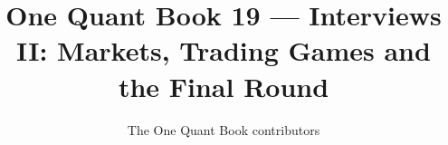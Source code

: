 \documentclass[11pt,a4paper,twoside,openany]{book}
\title{One Quant Book 19 --- Interviews II: Markets, Trading Games and the Final Round}
\author{The One Quant Book contributors}
\date{\bookdate}
\begin{document}
\frontmatter



\tableofcontents

\mainmatter


\appendix
\part{\omsolutionspart}


\backmatter
\printindex
\end{document}
